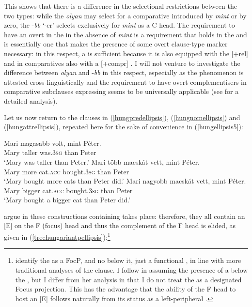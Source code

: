 This shows that there is a difference in the selectional restrictions between the two types: while the  \textit{olyan} may select for a comparative  introduced by \textit{mint} or by zero, the  -\textit{bb} `-er' selects exclusively for \textit{mint} as a C head. The requirement to have an overt  in the  in the absence of \textit{mint} is a requirement that holds in the  and is essentially one that makes the presence of some overt clause-type marker necessary: in this respect, a  is sufficient because it is also equipped with the [+rel]  and in comparatives also with a [+compr] . I will not venture to investigate the difference between \textit{olyan} and -\textit{bb} in this respect, especially as the phenomenon is attested cross-linguistically and the requirement to have overt complementisers in comparative subclauses expressing  seems to be universally applicable (see \citealt{bacskaiatkari2016alh} for a detailed analysis).

Let us now return to the clauses in (\ref{hungpredellipsis}), (\ref{hungnomellipsis}) and (\ref{hungattrellipsis}), repeated here for the sake of convenience in (\ref{hungellipsis5}):

\ea \label{hungellipsis5}
\ea \gll	Mari	magasabb	volt,	mint	Péter. \label{hungpredellipsisrepeat5}\\
Mary	taller	was.\textsc{3sg}	than	Peter\\
\glt `Mary was taller than Peter.'
\ex \gll Mari	több macskát vett, mint	Péter. \label{hungnomellipsisrepeat5}\\
Mary more	cat.\textsc{acc} bought.\textsc{3sg} than Peter\\
\glt `Mary bought more cats than Peter did.'
\ex \gll Mari nagyobb	macskát	vett,	mint Péter. \label{hungattrellipsisrepeat5}\\
Mary bigger	cat.\textsc{acc} bought.\textsc{3sg} than	Peter\\
\glt `Mary bought a bigger cat than Peter did.'
\z
\z

\citet[57--59]{bacskaiatkarikantor2012} argue in these constructions containing   takes place: therefore, they all contain an [E]  on the F (focus) head and thus the complement of the F head is elided, as given in (\ref{treehungariantpellipsis}):\footnote{\citet{bacskaiatkarikantor2012} identify the  as a FocP, and no  below it, just a functional , in line with more traditional analyses of the  clause. I follow \citet{ekiss2008li} in assuming the presence of a  below the , but I differ from her analysis in that I do not treat the  as a designated Focus projection. This has the advantage that the ability of the F head to host an [E]  follows naturally from its status as a left-peripheral .}

